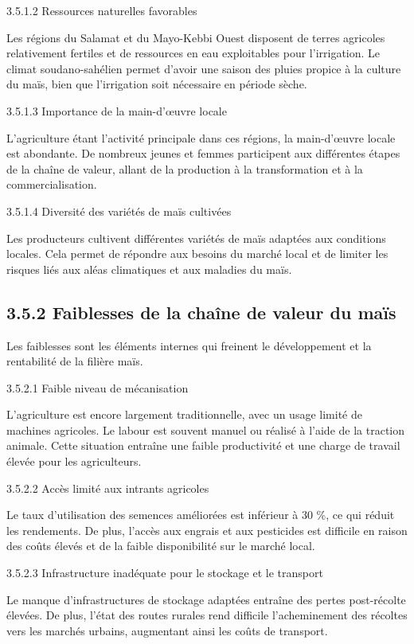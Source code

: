 \documentclass[12pt,oneside]{report}
\begin{document}
3.5.1.2 Ressources naturelles favorables

Les régions du Salamat et du Mayo-Kebbi Ouest disposent de terres agricoles relativement fertiles et de ressources en eau exploitables pour l’irrigation. Le climat soudano-sahélien permet d’avoir une saison des pluies propice à la culture du maïs, bien que l’irrigation soit nécessaire en période sèche.

3.5.1.3 Importance de la main-d’œuvre locale

L’agriculture étant l’activité principale dans ces régions, la main-d’œuvre locale est abondante. De nombreux jeunes et femmes participent aux différentes étapes de la chaîne de valeur, allant de la production à la transformation et à la commercialisation.

3.5.1.4 Diversité des variétés de maïs cultivées

Les producteurs cultivent différentes variétés de maïs adaptées aux conditions locales. Cela permet de répondre aux besoins du marché local et de limiter les risques liés aux aléas climatiques et aux maladies du maïs.

\subsection{3.5.2 Faiblesses de la chaîne de valeur du maïs}
Les faiblesses sont les éléments internes qui freinent le développement et la rentabilité de la filière maïs.

3.5.2.1 Faible niveau de mécanisation

L’agriculture est encore largement traditionnelle, avec un usage limité de machines agricoles. Le labour est souvent manuel ou réalisé à l’aide de la traction animale. Cette situation entraîne une faible productivité et une charge de travail élevée pour les agriculteurs.

3.5.2.2 Accès limité aux intrants agricoles

Le taux d’utilisation des semences améliorées est inférieur à 30 \%, ce qui réduit les rendements. De plus, l’accès aux engrais et aux pesticides est difficile en raison des coûts élevés et de la faible disponibilité sur le marché local.

3.5.2.3 Infrastructure inadéquate pour le stockage et le transport

Le manque d’infrastructures de stockage adaptées entraîne des pertes post-récolte élevées. De plus, l’état des routes rurales rend difficile l’acheminement des récoltes vers les marchés urbains, augmentant ainsi les coûts de transport.
\end{document}
